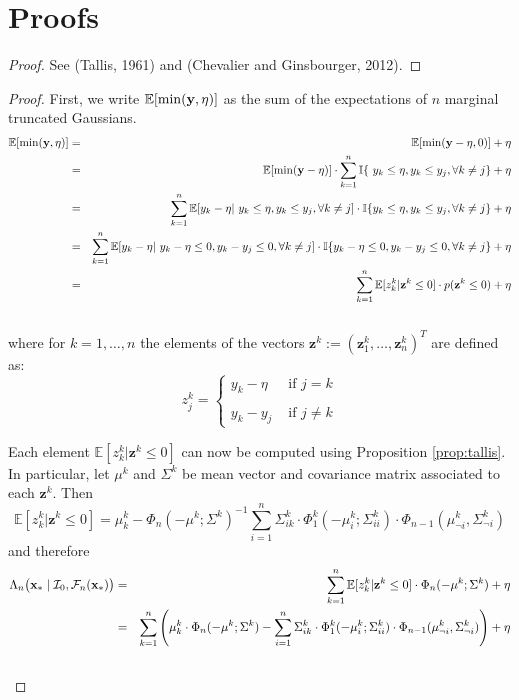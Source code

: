 \documentclass{article} %
\newcommand{\I}{\mathcal{I}}
\newcommand{\E}{\mathbb{E}}
\newcommand{\future}{\mathcal{F}}
\newcommand{\ind}{\mathbb{I}}
\newcommand{\bz}{\textbf{z}}
\newtheorem{proof}{Proof}
\begin{document}
\section{Proofs}

\begin{proof}
See (Tallis, 1961) and (Chevalier and Ginsbourger, 2012).
\end{proof}


\begin{proof}
First, we write $\E [\min (\dataVector,\eta)]$ as the sum of the expectations of $n$ marginal truncated Gaussians. 
\begin{eqnarray}\label{eq:expected_loss_oracle} \nonumber
\E [\min (\dataVector,\eta)] & = & \E [\min (\dataVector-\eta,0)] +\eta\\  \nonumber
 & = & \E [\min (\dataVector-\eta)] \cdot \sum_{k=1}^n\ind\{\ y_k\leq \eta,  y_k\leq y_j, \forall k\neq j  \} +  \eta\\  \nonumber
 & = & \sum_{k=1}^n\E [y_k-\eta|\ y_k\leq \eta,  y_k\leq y_j, \forall k\neq j ] \cdot \ind\{y_k\leq \eta,  y_k\leq y_j, \forall k\neq j  \} +  \eta\\  \nonumber
 &  = & \sum_{k=1}^n\E [y_k-\eta|\ y_k - \eta \leq 0 ,  y_k - y_j\leq 0 , \forall k\neq j ] \cdot \ind\{y_k - \eta \leq 0 ,  y_k - y_j\leq 0, \forall k\neq j  \} +  \eta\\ 
 &  = & \sum_{k=1}^n\E [ z^k_k|\bz^k \leq 0] \cdot p(\bz^k \leq 0) +  \eta\\ 
   \nonumber
\end{eqnarray}
where for $k=1,\dots,n$ the elements of the vectors $\bz^k:= (\bz^k_1,\dots,\bz^k_n)^T$ are defined as:
$$z_j^k= \left\{ \begin{array}{lcl}
y_k - \eta & \mbox{ if } j=k \\
  \\
y_k - y_j  &   \mbox{ if } j \neq k
\end{array}
\right.$$

Each element $\E [ z^k_k|\bz^k \leq 0]$ can now be computed using Proposition \ref{prop:tallis}. In particular, let $\mu^k$ and $\Sigma^k$ be mean vector and covariance matrix associated to each $\bz^k$. Then 
$$\E [ z^k_k|\bz^k \leq 0]  = \mu^k_k -  \Phi_n ( -\mu^k; \Sigma^k)^{-1} \sum_{i=1}^n \Sigma^k_{ik} \cdot \Phi^k_1(-\mu^k_i;\Sigma^k_{ii}) \cdot \Phi_{n-1}(\mu^k_{\neg i}, \Sigma^k_{\neg i}) $$
and therefore
\begin{eqnarray}\nonumber
\Lambda_n \bigl(\latentVector_* \mid \I_0, \future_{n}(\latentVector_*) \bigr) & = &   \sum_{k=1}^n\E [ z^k_k|\bz^k \leq 0] \cdot \Phi_n ( -\mu^k; \Sigma^k) +  \eta\\  \nonumber
& = &\sum_{k=1}^n \left(  \mu^k_k \cdot \Phi_n ( -\mu^k; \Sigma^k) -  \sum_{i=1}^n \Sigma^k_{ik} \cdot \Phi^k_1(-\mu^k_i;\Sigma^k_{ii}) \cdot \Phi_{n-1}(\mu^k_{\neg i}, \Sigma^k_{\neg i}) \right) + \eta \\ \nonumber
\end{eqnarray}


\end{proof}
\end{document}
